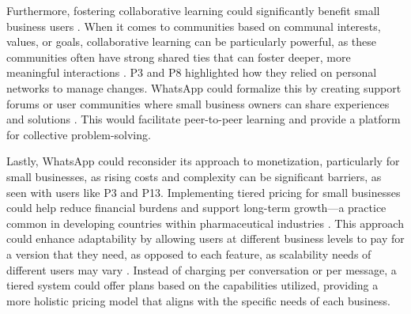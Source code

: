 Furthermore, fostering collaborative learning could significantly benefit small business users \cite{doi:10.1177/1461444816629474}. When it comes to communities based on communal interests, values, or goals, collaborative learning can be particularly powerful, as these communities often have strong shared ties that can foster deeper, more meaningful interactions \cite{panitz1998encouraging}. P3 and P8 highlighted how they relied on personal networks to manage changes. WhatsApp could formalize this by creating support forums or user communities where small business owners can share experiences and solutions \cite{10.1145/97243.97271, wulf2008component}. This would facilitate peer-to-peer learning and provide a platform for collective problem-solving. 

Lastly, WhatsApp could reconsider its approach to monetization, particularly for small businesses, as rising costs and complexity can be significant barriers, as seen with users like P3 and P13. Implementing tiered pricing for small businesses could help reduce financial burdens and support long-term growth—a practice common in developing countries within pharmaceutical industries \cite{moon2011winwin}. This approach could enhance adaptability by allowing users at different business levels to pay for a version that they need, as opposed to each feature, as scalability needs of different users may vary \cite{4085532}. Instead of charging per conversation or per message, a tiered system could offer plans based on the capabilities utilized, providing a more holistic pricing model that aligns with the specific needs of each business.




























































































